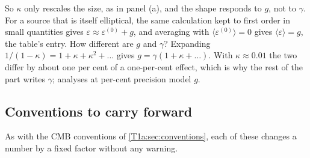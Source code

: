 So $\kappa$ only rescales the size, as in panel (a), and the shape responds to $g$, not to $\gamma$. For a source that is itself elliptical, the same calculation kept to first order in small quantities gives $\varepsilon\approx\varepsilon^{(0)}+g$, and averaging with $\langle\varepsilon^{(0)}\rangle=0$ gives $\langle\varepsilon\rangle=g$, the table's entry. How different are $g$ and $\gamma$? Expanding $1/(1-\kappa)=1+\kappa+\kappa^2+\dots$ gives $g=\gamma(1+\kappa+\dots)$. With $\kappa\approx0.01$ the two differ by about one per cent of a one-per-cent effect, which is why the rest of the part writes $\gamma$; analyses at per-cent precision model $g$.

\subsection{Conventions to carry forward}
\label{T1b:sec:conventions}

As with the CMB conventions of \cref{T1a:sec:conventions}, each of these changes a number by a fixed factor without any warning.

